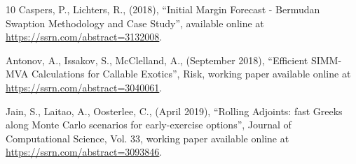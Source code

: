 \documentclass[11pt,a4paper,oneside]{article}
\begin{document}
\begin{thebibliography}{10}
  Caspers, P., Lichters, R.,
  (2018),
  ``Initial Margin Forecast - Bermudan Swaption Methodology and Case Study'',
  available online at \url{https://ssrn.com/abstract=3132008}.
  
  Antonov, A., Issakov, S., McClelland, A.,
  (September 2018),
  ``Efficient SIMM-MVA Calculations for Callable Exotics'',
  Risk,
  working paper available online at \url{https://ssrn.com/abstract=3040061}.
  
  Jain, S., Laitao, A., Oosterlee, C.,
  (April 2019),
  ``Rolling Adjoints: fast Greeks along Monte Carlo scenarios for early-exercise options'',
  Journal of Computational Science, Vol. 33, 
  working paper available online at \url{https://ssrn.com/abstract=3093846}.








\end{thebibliography}
\end{document}
